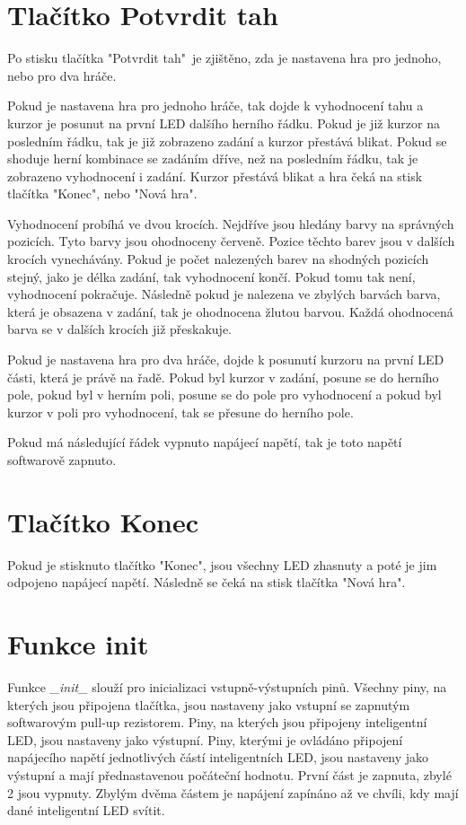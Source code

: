 \section{Tlačítko Potvrdit tah}
Po stisku tlačítka "Potvrdit tah"\  je zjištěno, zda je nastavena hra pro jednoho, nebo pro dva hráče. 

Pokud je nastavena hra pro jednoho hráče, tak dojde k vyhodnocení tahu a kurzor je posunut na první LED dalšího herního řádku. Pokud je již 
kurzor na posledním řádku, tak je již zobrazeno zadání a kurzor přestává blikat. Pokud se shoduje herní kombinace se zadáním dříve, než na 
posledním řádku, tak je zobrazeno vyhodnocení i zadání. Kurzor přestává blikat a hra čeká na stisk tlačítka "Konec", nebo "Nová hra". 

Vyhodnocení probíhá ve dvou krocích. Nejdříve jsou hledány barvy na správných pozicích. Tyto barvy jsou ohodnoceny červeně. Pozice těchto 
barev jsou v dalších krocích vynechávány. Pokud je počet nalezených barev na shodných pozicích stejný, jako je délka zadání, tak vyhodnocení 
končí. Pokud tomu tak není, vyhodnocení pokračuje. Následně pokud je nalezena ve zbylých barvách barva, která je obsazena v zadání, tak je 
ohodnocena žlutou barvou. Každá ohodnocená barva se v dalších krocích již přeskakuje. 

Pokud je nastavena hra pro dva hráče, dojde k posunutí kurzoru na první LED části, která je právě na řadě. Pokud byl kurzor v zadání, posune
se do herního pole, pokud byl v herním poli, posune se do pole pro vyhodnocení a pokud byl kurzor v poli pro vyhodnocení, tak se přesune
do herního pole. 

Pokud má následující řádek vypnuto napájecí napětí, tak je toto napětí softwarově zapnuto. 

\section{Tlačítko Konec}
Pokud je stisknuto tlačítko "Konec", jsou všechny LED zhasnuty a poté je jim odpojeno napájecí napětí. Následně se čeká na stisk tlačítka
"Nová hra". 

\iffalse
\section{Funkce init}
Funkce {\it \_init\_} slouží pro inicializaci vstupně-výstupních pinů. Všechny piny, na kterých jsou připojena tlačítka, jsou nastaveny jako 
vstupní se zapnutým softwarovým pull-up rezistorem. Piny, na kterých jsou připojeny inteligentní LED, jsou nastaveny jako výstupní. Piny,
kterými je ovládáno připojení napájecího napětí jednotlivých částí inteligentních LED, jsou nastaveny jako výstupní a mají přednastavenou 
počáteční hodnotu. První část je zapnuta, zbylé 2 jsou vypnuty. Zbylým dvěma částem je napájení zapínáno až ve chvíli, kdy mají dané 
inteligentní LED svítit.

